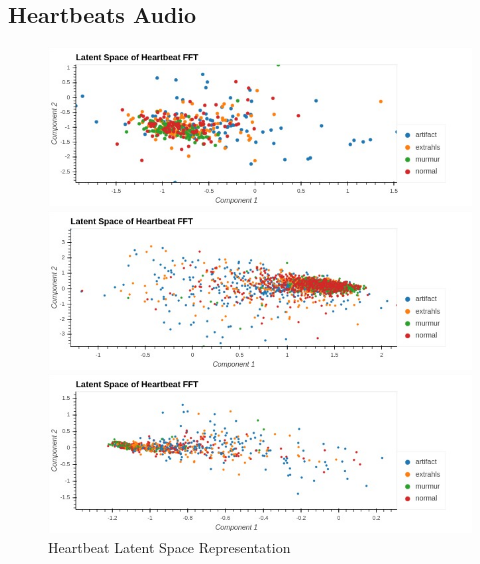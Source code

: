 \documentclass[12pt]{article}
\begin{document}
\newpage
\subsection{Heartbeats Audio}

\begin{figure}[!htb]
         \includegraphics[scale=0.5]{../../media/heartbeat.jpeg}
       
         \label{fig:heart1}
     
         \includegraphics[scale=0.5]{../../media/heartbeat1.jpeg}
     
         \label{fig:heart2}
     
     
         \centering
         \includegraphics[scale=0.5]{../../media/heartbeat2.jpeg}

         \label{fig:heart3}
        \caption{Heartbeat Latent Space Representation}
        \label{fig:hearts}
\end{figure}

\newpage
\end{document}

